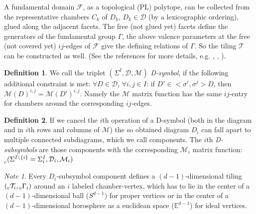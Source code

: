 \documentclass[12pt,a4paper]{article}
\numberwithin{equation}{section}
\newcommand{\leftsub}[2]{{\vphantom{#2}}_{#1}{#2}}
\theoremstyle{plain}%
\theoremstyle{definition}
\newtheorem{defn}{Definition}[section]
\theoremstyle{remark}
\newtheorem*{note}{Note}
\begin{document}
A fundamental domain $\mathcal{F}$, as a topological (PL) polytope, can be collected
from the representative chambers $C_k$ of $D_k$, $D_k\in\mathcal{D}$ (by a
lexicographic ordering), glued along the adjacent facets. The free (not glued
yet) facets define the generators of the fundamental group $\Gamma$, the above
valence parameters at the free (not covered yet) $ij$-edges of $\mathcal{F}$
give the defining relations of $\Gamma$. So the tiling $\mathcal{T}$ can be
constructed as well. (See the references for more details,
e.g. \cite{DHM93}, \cite{M96}, \cite{M11}).

\begin{defn}
  We call the triplet $(\Sigma^I,\mathcal{D},\mathcal{M})$ {\em D-symbol}, if the
  following additional constraint is met:
  $\forall D\in \mathcal{D}$, $\forall i,j\in I$: if $D' \in
  <\sigma^i,\sigma^j>D$, then $\mathcal{M}(D)^{i,j}=\mathcal{M}(D')^{i,j}$.
  Namely the $\mathcal{M}$ matrix function has the same $ij$-entry for chambers around the
  corresponding $ij$-edges.
\end{defn}


\begin{defn}
  If we cancel the $i$th operation of a D-symbol (both in the diagram and in
  $i$th rows and columns of $\mathcal{M}$) the so obtained diagram $D_i$ can fall apart to multiple
  connected subdiagrams, which we call components. The $i$th {\em D-subsymbols} are
  those components with the corresponding $\mathcal{M}_i$ matrix function:
  $\leftsub{c}{(\Sigma^{I\setminus\{i\}}=\Sigma^I_i,\mathcal{D}_i,\mathcal{M}_i)}$
\end{defn}

\begin{note}
  Every $D_i$-subsymbol component defines a $(d-1)$-dimensional tiling
  $(\leftsub{c}{\mathcal{T}}_i,\leftsub{c}{\Gamma}_i)$ around an $i$ labeled chamber-vertex, which has to lie
  in the center of a $(d-1)$-dimensional ball ($S^{d-1}$) for proper vertices or
  in the center of a $(d-1)$-dimensional horosphere as a
  euclidean space ($\mathbb{E}^{d-1}$) for ideal vertices.
\end{note}
\end{document}
